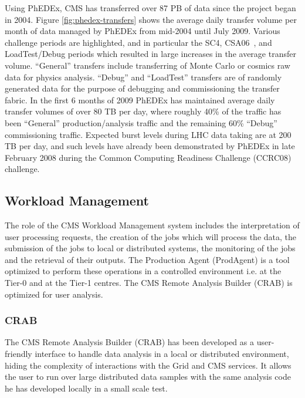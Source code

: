 Using PhEDEx, CMS has transferred over 87 PB of data since the project 
began in 2004.  Figure \ref{fig:phedex-transfers} shows the average
daily transfer volume per month of data managed by PhEDEx from
mid-2004 until July 2009.  Various challenge periods are highlighted,
and in particular the SC4, CSA06~\cite{RefPastExp}, and LoadTest/Debug periods which resulted
in large increases in the average transfer volume.  ``General'' transfers
include transferring of Monte Carlo or cosmics raw data for physics
analysis.  ``Debug'' and ``LoadTest'' transfers are of randomly
generated data for the purpose of debugging and commissioning the
transfer fabric.  In the first 6 months of 2009 PhEDEx has maintained
average daily transfer volumes of over 80 TB per day, where roughly
40\% of the traffic has been ``General'' production/analysis traffic
and the remaining 60\% ``Debug'' commissioning traffic.  Expected
burst levels during LHC data taking are at 200 TB per day, and such
levels have already been demonstrated by PhEDEx in late February 2008
during the Common Computing Readiness Challenge (CCRC08) challenge.

\subsection{Workload Management}
The role of the CMS Workload Management system includes the interpretation of user processing requests, the creation of the jobs which will process the data, the submission of the jobs to local or distributed systems, the monitoring of the jobs and the retrieval of their outputs. The Production Agent (ProdAgent)\cite{RefPA} is a tool optimized to perform these operations in a controlled environment i.e. at the Tier-0 and at the Tier-1 centres. The CMS Remote Analysis Builder (CRAB) is optimized for user analysis.

%
\label{sec:3_2}
\subsubsection{CRAB}
\label{sec:CRAB}
The CMS Remote Analysis Builder (CRAB)\cite{RefCRAB} has been developed as a user-friendly interface to handle data analysis in a local or distributed environment, hiding the complexity of interactions with the Grid and CMS services.
It allows the user to run over large distributed data samples with the same analysis code he has developed 
locally in a small scale test. 

